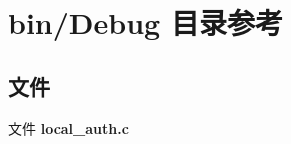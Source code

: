 \section{bin/\+Debug 目录参考}
\label{dir_68323fab176bfe54037497825ea333b7}
\subsection*{文件}
\begin{DoxyCompactItemize}
\item 
文件 \textbf{ local\+\_\+auth.\+c}
\end{DoxyCompactItemize}
